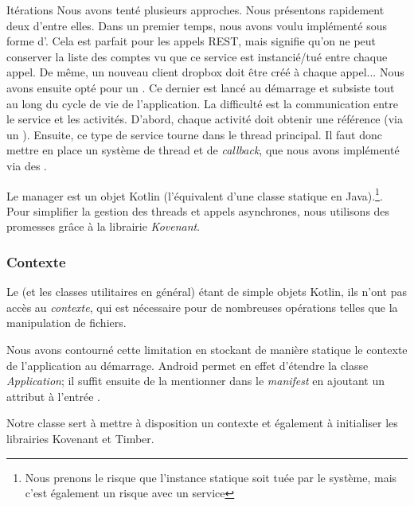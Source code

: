 \begin{notepar}{Itérations}
Nous avons tenté plusieurs approches. Nous présentons rapidement deux d'entre elles.
\newline\newline
Dans un premier temps, nous avons voulu implémenté  sous forme d'. Cela est parfait pour les appels REST, mais signifie qu'on ne peut conserver la liste des comptes vu que ce service est instancié/tué entre chaque appel. De même, un nouveau client dropbox doit être créé à chaque appel...
\newline\newline
Nous avons ensuite opté pour un . Ce dernier est lancé au démarrage et subsiste tout au long du cycle de vie de l'application. La difficulté est la communication entre le service et les activités. 
D'abord, chaque activité doit obtenir une référence (via un ). Ensuite, ce type de service tourne dans le thread principal. Il faut donc mettre en place un système de thread et de \emph{callback}, que nous avons implémenté via des . 
\end{notepar}

Le manager est un objet Kotlin (l'équivalent d'une classe statique en Java).\footnote{Nous prenons le risque que l'instance statique soit tuée par le système, mais c'est également un risque avec un service}. Pour simplifier la gestion des threads et appels asynchrones, nous utilisons des promesses grâce à la librairie \emph{Kovenant}.

\subsubsection*{Contexte}

Le  (et les classes utilitaires en général) étant de simple objets Kotlin, ils n'ont pas accès au \emph{contexte}, qui est nécessaire pour de nombreuses opérations telles que la manipulation de fichiers.

Nous avons contourné cette limitation en stockant de manière statique le contexte de l'application au démarrage. Android permet en effet d'étendre la classe \emph{Application}; il suffit ensuite de la mentionner dans le \emph{manifest} en ajoutant un attribut  à l'entrée .

Notre classe  sert à mettre à disposition un contexte et également à initialiser les librairies Kovenant et Timber.

